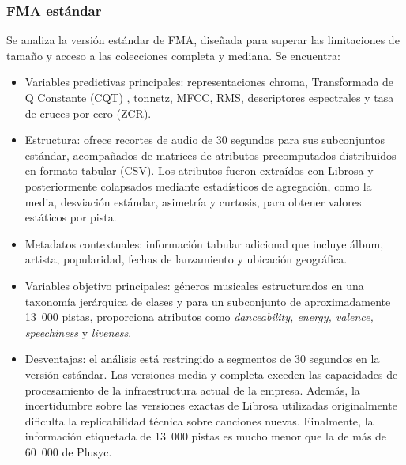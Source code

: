 \subsubsection{FMA estándar}
Se analiza la versión estándar de FMA, diseñada para superar las limitaciones de tamaño y acceso a las colecciones completa y mediana. Se encuentra:
\begin{itemize}
    \item Variables predictivas principales: representaciones chroma, Transformada de Q Constante (CQT) \citep{muller2015fundamentals}, tonnetz, MFCC, RMS, descriptores espectrales y tasa de cruces por cero (ZCR).
    \item Estructura: ofrece recortes de audio de 30 segundos para sus subconjuntos estándar, acompañados de matrices de atributos precomputados distribuidos en formato tabular (CSV). Los atributos fueron extraídos con Librosa y posteriormente colapsados mediante estadísticos de agregación, como la media, desviación estándar, asimetría y curtosis, para obtener valores estáticos por pista.
    \item Metadatos contextuales: información tabular adicional que incluye álbum, artista, popularidad, fechas de lanzamiento y ubicación geográfica.
    \item Variables objetivo principales: géneros musicales estructurados en una taxonomía jerárquica de clases y para un subconjunto de aproximadamente 13~000 pistas, proporciona atributos como \textit{danceability, energy, valence, speechiness} y \textit{liveness}.
    \item Desventajas: el análisis está restringido a segmentos de 30 segundos en la versión estándar. Las versiones media y completa exceden las capacidades de procesamiento de la infraestructura actual de la empresa. Además, la incertidumbre sobre las versiones exactas de Librosa utilizadas originalmente dificulta la replicabilidad técnica sobre canciones nuevas. Finalmente, la información etiquetada de 13~000 pistas es mucho menor que la de más de 60~000 de Plusyc.
\end{itemize}

